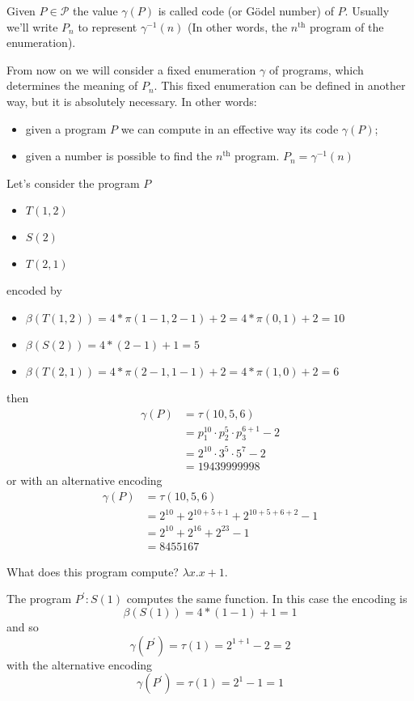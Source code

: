 \begin{definition}
  Given $P \in \mathcal{P}$ the value $\gamma(P)$ is called code (or
  Gödel number) of $P$. Usually we'll write $P_n$ to represent
  $\gamma^{-1}(n)$ (In other words, the $n^{\mbox{th}}$ program of the
  enumeration).
\end{definition}

\begin{observation}
  From now on we will consider a fixed
enumeration $\gamma$ of programs, which
determines the meaning of $P_n$. This fixed enumeration can be
defined in another way, but it is absolutely necessary. In other words:
\begin{itemize}
\item given a program $P$ we can compute in an effective way its code
  $\gamma(P)$;
\item given a number is possible to find the $n^{\mbox{th}}$ program.
  $P_n = \gamma^{-1}(n)$
\end{itemize}
\end{observation}

\begin{example}
  Let's consider the program $P$
  \begin{itemize}
  \item[] $T(1,2)$
  \item[] $S(2)$
  \item[] $T(2,1)$
  \end{itemize}
  encoded by
  \begin{itemize}
  \item[] $\beta(T(1,2)) = 4 * \pi(1-1,2-1) + 2 = 4 * \pi(0,1) + 2 = 10$
  \item[] $\beta(S(2)) = 4 * (2-1) + 1 = 5$
  \item[] $\beta(T(2,1)) = 4 * \pi(2-1,1-1) + 2 = 4 * \pi(1,0) + 2 = 6$
  \end{itemize}
  then
      \begin{align*}
        \gamma(P) & = \tau(10,5,6) \\
                  & = p_1^{10} \cdot p_2^5 \cdot p_3^{6+1} - 2 \\
                  & = 2^{10} \cdot 3^5 \cdot 5^7 -2 \\
                  & = 19439999998
      \end{align*}
  or with an alternative encoding
  \begin{align*}
    \gamma(P) & = \tau(10,5,6) \\
              & = 2^{10} + 2^{10+5+1} + 2^{10+5+6+2} - 1 \\
              & = 2^{10} + 2^{16} + 2^{23} - 1 \\
              & = 8455167
  \end{align*}

  What does this program compute? $\lambda x . x+1$.

  The program $P^\prime : S(1)$ computes the same function. 
  In this case the encoding is
  \[\beta(S(1)) = 4 * (1-1) + 1 = 1\] and so
  \[\gamma(P^\prime) = \tau(1) = 2^{1+1} - 2 = 2\]
  with the alternative encoding
  \[\gamma(P^\prime) = \tau(1) = 2^1 - 1 = 1\]
\end{example}

